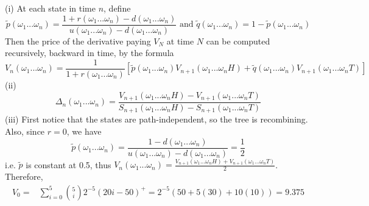 \documentclass[12pt]{article}
\newenvironment{problem}[2][Problem]{\begin{trivlist}
		\item[\hskip \labelsep {\bfseries #1}\hskip \labelsep {\bfseries #2.}]}{\end{trivlist}}
\begin{document}
	\begin{problem}{9}\end{problem}
	(i) At each state in time $n$, define 
	$$\tilde{p}(\omega_1...\omega_n) = \frac{1+r(\omega_1...\omega_n)-d(\omega_1...\omega_n)}{u(\omega_1...\omega_n)-d(\omega_1...\omega_n)}\text{ and } \tilde{q}(\omega_1...\omega_n) = 1-\tilde{p}(\omega_1...\omega_n)$$
	Then the price of the derivative paying $V_N$ at time $N$ can be computed recursively, backward in time, by the formula
	$$V_n(\omega_1...\omega_n)=\frac{1}{1+r(\omega_1...\omega_n)}[\tilde{p}(\omega_1...\omega_n)V_{n+1}(\omega_1...\omega_nH)+\tilde{q}(\omega_1...\omega_n)V_{n+1}(\omega_1...\omega_nT)]$$
	(ii) $$\Delta_n(\omega_1...\omega_n)= \frac{V_{n+1}(\omega_1...\omega_nH)-V_{n+1}(\omega_1...\omega_nT)}{S_{n+1}(\omega_1...\omega_nH)-S_{n+1}(\omega_1...\omega_nT)}$$
	(iii) First notice that the states are path-independent, so the tree is recombining.
	Also, since $r=0$, we have $$\tilde{p}(\omega_1...\omega_n) = \frac{1-d(\omega_1...\omega_n)}{u(\omega_1...\omega_n)-d(\omega_1...\omega_n)} = \frac{1}{2}$$
	i.e. $\tilde{p}$ is constant at 0.5, thus $V_n(\omega_1...\omega_n) = \frac{V_{n+1}(\omega_1...\omega_nH)+V_{n+1}(\omega_1...\omega_nT)}{2}$. Therefore, 
	\begin{align*}V_0 =& \sum_{i=0}^5{5 \choose i}2^{-5}(20i - 50)^+ = 2^{-5}(50+5(30)+10(10))=9.375\end{align*}
	 
\end{document}
